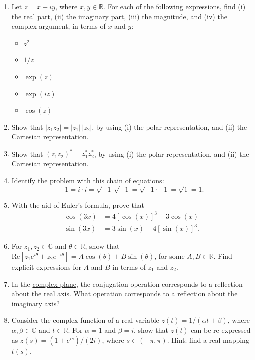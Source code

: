 \documentclass[10pt,a4paper]{article}
\begin{document}
\begin{enumerate}
\item
  Let $z = x + iy$, where $x, y \in \mathbb{R}$. For each of the
  following expressions, find (i) the real part, (ii) the imaginary
  part, (iii) the magnitude, and (iv) the complex argument, in terms
  of $x$ and $y$:
  \begin{itemize}
  \item $z^2$
  \item $1/z$
  \item $\exp(z)$
  \item $\exp(iz)$
  \item $\cos(z)$
  \end{itemize}

\item
Show that $|z_1 z_2| = |z_1|\, |z_2|$, by using (i) the polar
representation, and (ii) the Cartesian representation.

\item
  Show that $(z_1 z_2)^* = z_1^* z_2^*$, by using (i) the polar
  representation, and (ii) the Cartesian representation.

\item
  Identify the problem with this chain of equations:
  \begin{equation*}
    -1 = i \cdot i =
    \sqrt{-1}\,\sqrt{-1} = \sqrt{-1 \cdot -1} = \sqrt{1} = 1.    
  \end{equation*}

\item
  With the aid of Euler's formula, prove that
  \begin{align}
    \cos(3x) &= 4[\cos(x)]^3 -3\cos(x)\\
    \sin(3x) &= 3\sin(x)-4[\sin(x)]^3.
  \end{align}

\item
  For $z_1, z_2 \in \mathbb{C}$ and $\theta \in \mathbb{R}$, show that
  $\mathrm{Re}\left[z_1 e^{i\theta} + z_2 e^{-i\theta}\right] = A
  \cos(\theta) + B \sin(\theta)$, for some $A, B \in \mathbb{R}$. Find
  explicit expressions for $A$ and $B$ in terms of $z_1$ and $z_2$.

\item
  In the \hyperref[the-complex-plane]{complex plane}, the conjugation
  operation corresponds to a reflection about the real axis. What
  operation corresponds to a reflection about the imaginary axis?

\item
  Consider the complex function of a real variable $z(t) = 1/(\alpha t
  + \beta)$, where $\alpha, \beta \in \mathbb{C}$ and $t \in
  \mathbb{R}$.  For $\alpha = 1$ and $\beta = i$, show that $z(t)$ can
  be re-expressed as $z(s) = (1+e^{is})/(2i)$, where $s \in
  (-\pi,\pi)$.  Hint: find a real mapping $t(s)$.


\end{enumerate}
\end{document}
